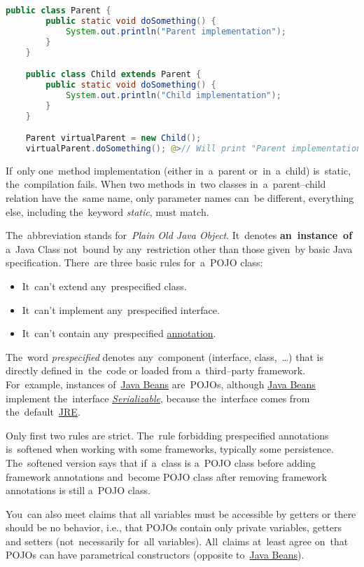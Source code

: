 \example
\begin{lstlisting}[language=Java]
    public class Parent {
        public static void doSomething() {
            System.out.println("Parent implementation");
        }
    }

    public class Child extends Parent {
        public static void doSomething() {
            System.out.println("Child implementation");
        }
    }

    Parent virtualParent = new Child();
    virtualParent.doSomething(); @>// Will print "Parent implementation"
\end{lstlisting}

\note If~only one~method implementation (either in~a~parent or~in~a~child) is~static, the~compilation fails. When two methods in~two classes in~a~parent--child relation have the~same name, only parameter names can~be different, everything else, including the~keyword \textit{static}, must match.

\label{pojo}
The~abbreviation stands for~\textit{Plain Old Java Object}. It~denotes \textbf{an~instance~of} a~Java Class not~bound by any~restriction other than those given~by basic Java specification. There~are three basic rules for~a~POJO class:
\begin{itemize}
    \item It~can't extend any~prespecified class.
    \item It~can't implement any~prespecified interface.
    \item It~can't contain any~prespecified \hyperref[javaannotation]{annotation}.
\end{itemize}
\noindent The~word \textit{prespecified} denotes any~component (interface, class,~\dots) that is directly defined in~the~code or loaded from a~third--party framework. For~example, instances of~\hyperref[javabeans]{Java Beans} are~POJOs, although \hyperref[javabeans]{Java Beans} implement the~interface \hyperref[serialization]{\textit{Serializable}}, because the~interface comes from the~default~\hyperref[jdkjrejvm]{JRE}.

\warning Only first two rules are strict. The~rule forbidding prespecified annotations is~softened when working with some frameworks, typically some persistence. The~softened version says that if~a~class is a~POJO class before adding framework annotations and~become POJO class after removing framework annotations is still a~POJO class.

\warning You~can also meet claims that all variables must be accessible by getters or there should be no behavior, i.e., that POJOs contain only private variables, getters and setters (not~necessarily for~all variables). All~claims at~least agree on~that POJOs can have parametrical constructors (opposite to~\hyperref[javabeans]{Java Beans}).

